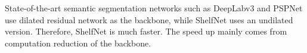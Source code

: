 \documentclass[10pt,twocolumn,letterpaper]{article}
\begin{document}
State-of-the-art semantic segmentation networks such as DeepLabv3 and PSPNet use dilated residual network as the backbone, while ShelfNet uses an undilated version. Therefore, ShelfNet is much faster. The speed up mainly comes from computation reduction of the backbone.
\vspace{-0.1cm}
\begin{table}[htb!]
\caption{\small{Inference speed of different backbones. ``Dilated'' means the network uses dilated convolution.}}
\label{table_backbone}
\end{table}
\end{document}
